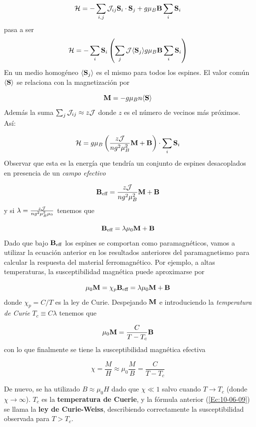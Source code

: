 \begin{equation}
	\mathcal{H} = - \sum_{i,j} \mathcal{J}_{ij} \mathbf{S}_i \cdot \mathbf{S}_j + g\mu_B \mathbf{B} \sum_i \mathbf{S}_i
\end{equation}
pasa a ser 
\begin{equation}
	\mathcal{H} = - \sum_{i} \mathbf{S}_i \left(  \sum_j \mathcal{J} \langle \mathbf{S}_j \rangle g\mu_B \mathbf{B} \sum_i \mathbf{S}_i \right)
\end{equation}
En un medio homogéneo $\langle \mathbf{S}_j \rangle$ es el mismo para todos los espines. El valor común $\langle \mathbf{S} \rangle$ se relaciona con la magnetización por

\begin{equation}
	\mathbf{M} = - g \mu_B n \langle \mathbf{S} \rangle
\end{equation}
Además la suma $\sum_j \mathcal{J}_{ij} \approx z \mathcal{J}$ donde $z$ es el número de vecinos más próximos. Así:

\begin{equation}
	\mathcal{H} = g \mu_B \left( \frac{z\mathcal{J}}{ng^2\mu_B^2}\mathbf{M} + \mathbf{B} \right) \cdot \sum_i \mathbf{S}_i
\end{equation}
Observar que esta es la energía que tendría un conjunto de espines desacoplados en presencia de un \textit{campo efectivo}

\begin{equation}
	\mathbf{B}_{\text{eff}} = \frac{z\mathcal{J}}{ng^2\mu_B^2}\mathbf{M} + \mathbf{B}
\end{equation}
y si $\lambda = \frac{z\mathcal{J}}{ng^2\mu_B^2\mu_0}$ tenemos que

\begin{equation}
	\mathbf{B}_{\text{eff}} = \lambda \mu_0\mathbf{M} + \mathbf{B}
\end{equation}
Dado que bajo $	\mathbf{B}_{\text{eff}} $ los espines se comportan como paramagnéticos, vamos a utilizar la ecuación anterior en los resultados anteriores del paramagnetismo para calcular la respuesta del material ferromagnético. Por ejemplo, a altas temperaturas, la susceptibilidad magnética puede aproximarse por

\begin{equation}
	\mu_0 \mathbf{M} = \chi_p \mathbf{B}_{\text{eff}}  = \lambda \mu_0\mathbf{M} + \mathbf{B}
\end{equation}
donde $\chi_p=C/T$ es la ley de Curie. Despejando $\mathbf{M}$ e introduciendo la \textit{temperatura de Curie} $T_c \equiv C\lambda$ tenemos que

\begin{equation}
	\mu_0 \mathbf{M} = \frac{C}{T-T_c} \mathbf{B}
\end{equation}
con lo que finalmente se tiene la susceptibilidad magnética efectiva
\begin{mybox}
\begin{equation}
	\chi = \frac{M}{H} \approx \mu_0 \frac{M}{B} = \frac{C}{T-T_c}
	\label{Ec:10-06-09}
\end{equation}
\end{mybox}
De nuevo, se ha utilizado $B\approx \mu_0 H$ dado que $\chi \ll 1$ salvo cuando $T\rightarrow T_c$ (donde $\chi\rightarrow \infty$). $T_c$ es la \textbf{temperatura de Cuerie}, y la fórmula anterior (\ref{Ec:10-06-09}) se llama la \textbf{ley de Curie-Weiss}, describiendo correctamente la susceptibilidad observada para $T>T_c$. 

